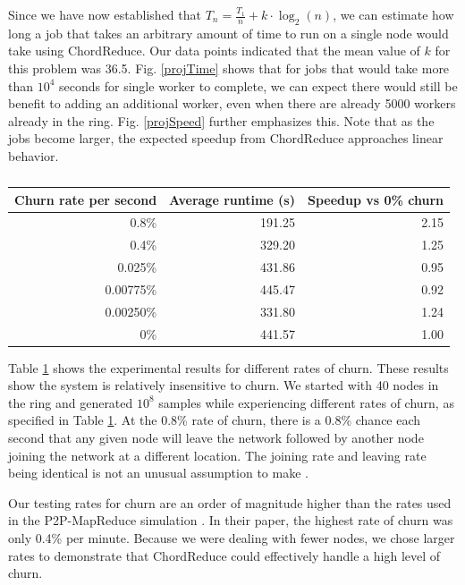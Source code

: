 \documentclass[10pt, conference, compsocconf]{IEEEtran}
\begin{document}
Since we have now established that $T_{n} = \frac{T_{1}}{n} + k \cdot \log_{2}(n)$, we can estimate how long a job that takes an arbitrary amount of time to run on a single node would take using ChordReduce.  Our data points indicated that the mean value of $k$ for this problem was 36.5.  Fig. \ref{projTime} shows that for jobs that would take more than $10^{4}$ seconds for single worker to complete, we can expect there would still be benefit to adding an additional worker, even when there are already 5000 workers already in the ring.  Fig. \ref{projSpeed} further emphasizes this. Note that as the jobs become larger, the expected speedup from ChordReduce  approaches linear behavior.


\begin{table}
    \centering
    \begin{tabular}{|r|r|r|} 
        \hline 
        Churn rate per second & Average runtime (s) & Speedup vs 0\% churn\\ \hline{}
        0.8\% & 191.25 & 2.15 \\ \hline
        0.4\% & 329.20 & 1.25 \\ \hline
        0.025\% & 431.86 & 0.95 \\ \hline 
        0.00775\%  & 445.47 & 0.92 \\ \hline 
        0.00250\% & 331.80  &  1.24 \\ \hline 
        0\% & 441.57 & 1.00 \\ \hline
    \end{tabular}
    \caption{} 
    \label{churnSpeed}
\end{table}


Table \ref{churnSpeed} shows the experimental results for different rates of churn. These results show the system  is relatively insensitive to churn.  We started with 40 nodes in the ring and generated $10^{8}$ samples while experiencing different rates of churn, as specified in Table \ref{churnSpeed}.  At the 0.8\% rate of churn, there is a 0.8\% chance each second that any given node will leave the network followed by another node joining the network at a different location. The joining rate and leaving rate being identical is not an unusual assumption to make \cite{marozzo2012p2p} \cite{load}.  

Our testing rates for churn are an order of magnitude higher than the rates used in the P2P-MapReduce simulation  \cite{marozzo2012p2p}.  In their paper, the highest rate of churn was only 0.4\% per minute. Because we were dealing with fewer nodes, we chose larger rates to demonstrate that ChordReduce could effectively handle a high level of churn.  
\end{document}
